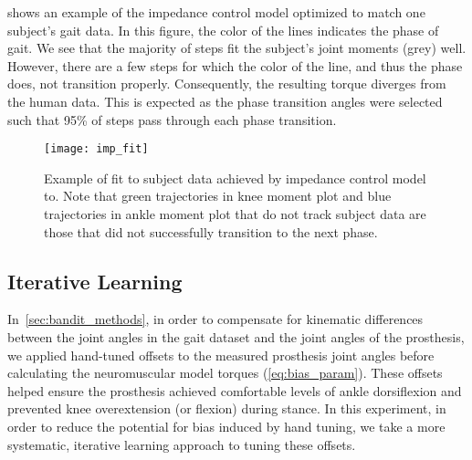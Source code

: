 shows an example of the impedance control model
optimized to match one subject's gait data. In this figure, the color of the
lines indicates the phase of gait. We see that the majority of steps fit the
subject's joint moments (grey) well. However, there are a few steps for which
the color of the line, and thus the phase does, not transition properly.
Consequently, the resulting torque diverges from the human data. This is
expected as the phase transition angles were selected such that 95\% of steps
pass through each phase transition.
\begin{figure}[t]
    \centering 
    \texttt{[image: imp\_fit]}
    \caption[Example of fit to subject data achieved by impedance control
    model]{Example of fit to subject data achieved by impedance control model
    to. Note that green trajectories in knee moment plot and blue trajectories
    in ankle moment plot that do not track subject data are those that did not
    successfully transition to the next phase.}\label{fig:treadmill_imp_fit}
\end{figure}

\subsection{Iterative Learning}\label{sec:treadmill_exp_iterative_learning}
In~\cref{sec:bandit_methods}, in order to compensate for kinematic differences
between the joint angles in the gait dataset and the joint angles of the
prosthesis, we applied hand-tuned offsets to the measured prosthesis joint
angles before calculating the neuromuscular model torques
(\cref{eq:bias_param}). These offsets helped ensure the prosthesis achieved
comfortable levels of ankle dorsiflexion and prevented knee overextension (or
flexion) during stance. In this experiment, in order to reduce the potential for
bias induced by hand tuning, we take a more systematic, iterative learning
approach to tuning these offsets.

